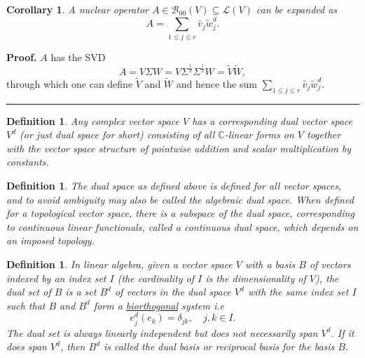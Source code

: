 \documentclass[aps,preprint]{revtex4}%
\newtheorem{corollary}[theorem]{Corollary}
\newtheorem{definition}[theorem]{Definition}
\newenvironment{proof}[1][Proof]{\noindent\textbf{#1.} }{\ \rule{0.5em}{0.5em}}
\begin{document}
\begin{corollary}
A nuclear operator $A\in\mathcal{B}_{00}\left(  V\right)  \subseteq
\mathcal{L}\left(  V\right)  $ can be expanded as
\begin{equation}
A=\sum_{1\leq j\leq r}\widetilde{v_{j}}\widetilde{w}_{j}^{d}.
\end{equation}

\end{corollary}

\begin{proof}
$A$ has the SVD
\begin{equation}
A=V\Sigma W=V\Sigma^{\frac{1}{2}}\Sigma^{\frac{1}{2}}W=\widetilde{V}%
\widetilde{W},
\end{equation}
through which one can define $\widetilde{V}$ and $\widetilde{W}$ and hence the
sum $\sum_{1\leq j\leq r}\widetilde{v_{j}}\widetilde{w}_{j}^{d}.$
\end{proof}

\begin{definition}
Any complex vector space $V$ has a corresponding dual vector space $V^{d}$ (or
just dual space for short) consisting of all $\mathbb{C}$-linear forms on $V$
together with the vector space structure of pointwise addition and scalar
multiplication by constants.
\end{definition}

\begin{definition}
The dual space as defined above is defined for all vector spaces, and to avoid
ambiguity may also be called the \emph{algebraic }dual space. When defined for
a topological vector space, there is a \emph{subspace of the dual space},
corresponding to \emph{continuous} linear functionals, called a
\emph{continuous dual space, which depends on an imposed topology}.
\end{definition}

\begin{definition}
In linear algebra, given a vector space $V$ with a basis $B$ of vectors
indexed by an index set $I$ (the cardinality of $I$ is the dimensionality of
$V$), the dual set of $B$ is a set $B^{d}$ of vectors in the dual space
$V^{d}$ with the same index set $I$ such that $B$ and $B^{d}$ form a
\underline{\emph{biorthogonal}} system i.e
\begin{equation}
e_{j}^{d}\left(  e_{k}\right)  =\delta_{jk},\quad j,k\in I.
\end{equation}
The dual set is always linearly independent but does not necessarily span
$V^{d}$. If it does span $V^{d}$, then $B^{d}$ is called the \emph{dual basis}
or \emph{reciprocal basis} for the basis $B$.
\end{definition}
\end{document}

